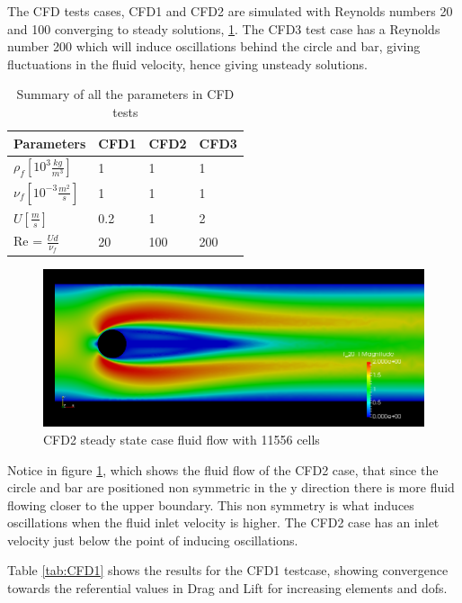 The CFD tests cases, CFD1 and CFD2 are simulated with Reynolds numbers 20 and 100 converging to steady solutions, \ref{tab:cfd_para}. The CFD3 test case has a Reynolds number 200 which will induce oscillations behind the circle and bar, giving fluctuations in the fluid velocity, hence giving unsteady solutions.

\vspace{1cm}

\begin{table}[H]
\centering
\caption{Summary of all the parameters in CFD tests}
\label{tab:cfd_para}
\begin{tabular}{|l|l|l|l|}
\hline
Parameters & CFD1 & CFD2 & CFD3 \\ \hline
$\rho_f [10^3 \frac{kg}{m^3}]$ & 1 & 1 & 1 \\ \hline
$\nu_f [10^{-3} \frac{m^2}{s}]$ & 1 & 1 & 1 \\ \hline
$ U [\frac{m}{s}] $ & 0.2 & 1 & 2 \\ \hline
Re = $\frac{Ud}{\nu_f}$ & 20 & 100 & 200 \\ \hline
\end{tabular}
\end{table}

\begin{figure}[H]
\label{fig:CFD2}
\includegraphics[scale=0.45, trim={9mm 0mm 0mm 10mm},clip]{./Verification_Validation/Hron_Turek/CFD2.png}
\caption{CFD2 steady state case fluid flow with 11556 cells}
\end{figure}

Notice in figure \ref{fig:CFD2}, which shows the fluid flow of the CFD2 case, that since the circle and bar are positioned non symmetric in the y direction there is more fluid flowing closer to the upper boundary. This non symmetry is what induces oscillations when the fluid inlet velocity is higher. The CFD2 case has an inlet velocity just below the point of inducing oscillations.

Table \ref{tab:CFD1} shows the results for the CFD1 testcase, showing convergence towards the referential values in Drag and Lift for increasing elements and dofs.

